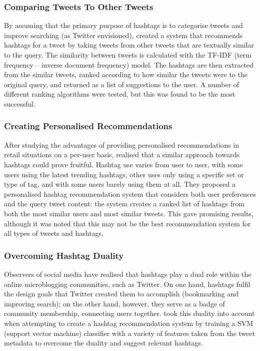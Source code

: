 \documentclass[12pt,a4paper]{article}
\begin{document}
\subsubsection{Comparing Tweets To Other Tweets}
By assuming that the primary purpose of hashtags is to categorise tweets and improve searching (as Twitter envisioned), \textcite{Zangerle:2011} created a system that recommends hashtags for a tweet by taking tweets from other tweets that are textually similar to the query. The similarity between tweets is calculated with the TF-IDF (term frequency -- inverse document frequency) model. The hashtags are then extracted from the similar tweets, ranked according to how similar the tweets were to the original query, and returned as a list of suggestions to the user. A number of different ranking algorithms were tested, but this was found to be the most successful.

\subsubsection{Creating Personalised Recommendations}
After studying the advantages of providing personalised recommendations in retail situations on a per-user basis, \textcite{Kywe:2012} realised that a similar approach towards hashtags could prove fruitful. Hashtag use varies from user to user, with some users using the latest trending hashtags, other uses only using a specific set or type of tag, and with some users barely using them at all. They proposed a personalised hashtag recommendation system that considers both user preferences and the query tweet content: the system creates a ranked list of hashtags from both the most similar users and most similar tweets. This gave promising results, although it was noted that this may not be the best recommendation system for all types of tweets and hashtags.

\subsubsection{Overcoming Hashtag Duality}
Observers of social media have realised that hashtags play a dual role within the online microblogging communities, such as Twitter. On one hand, hashtags fulfil the design goals that Twitter created them to accomplish (bookmarking and improving search); on the other hand, however, they serve as a badge of community membership, connecting users together. \textcite{Yang:2012} took this duality into account when attempting to create a hashtag recommendation system by training a SVM (support vector machine) classifier with a variety of features taken from the tweet metadata to overcome the duality and suggest relevant hashtags.
\end{document}
